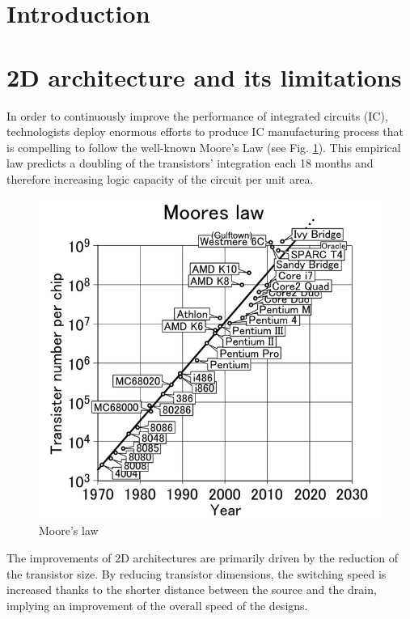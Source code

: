 \label{cha:rol.icdesign}

\begin{summary}
\lipsum[1]
\end{summary}

\section{Introduction}

\section{2D architecture and its limitations}

In order to continuously improve the performance of integrated circuits (IC), technologists deploy enormous efforts to produce IC manufacturing process that is compelling to follow the well-known Moore's Law (see Fig. \ref{fig:mooreslaw}). This empirical law predicts a doubling of the transistors' integration each 18 months and therefore increasing logic capacity of the circuit per unit area. 

\begin{figure}
\begin{center}
\includegraphics[width=0.75\linewidth]{mooreslaw.png}
\end{center}
\vspace{-0.5cm}
\caption{Moore's law \cite{mooreslawpic}}
\label{fig:mooreslaw}
\end{figure}

The improvements of 2D architectures are primarily driven by the reduction of the transistor size. By reducing transistor dimensions, the switching speed is increased thanks to the shorter distance between the source and the drain, implying an improvement of the overall speed of the designs.

